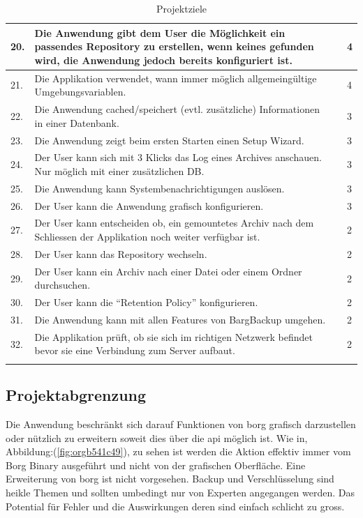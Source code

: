 \begin{longtable}{|p{1cm}|p{9cm}|p{1.5cm}|p{2cm}|}
\hline
20. & Die Anwendung gibt dem User die Möglichkeit ein passendes Repository zu erstellen, wenn keines gefunden wird, die Anwendung jedoch bereits konfiguriert ist. &  & 4\\
\hline
21. & Die Applikation verwendet, wann immer möglich allgemeingültige Umgebungsvariablen. &  & 4\\
\hline
22. & Die Anwendung cached/speichert (evtl. zusätzliche) Informationen in einer Datenbank. &  & 3\\
\hline
23. & Die Anwendung zeigt beim ersten Starten einen Setup Wizard. &  & 3\\
\hline
24. & Der User kann sich mit 3 Klicks das Log eines Archives anschauen. Nur möglich mit einer zusätzlichen DB. &  & 3\\
\hline
25. & Die Anwendung kann Systembenachrichtigungen auslösen. &  & 3\\
\hline
26. & Der User kann die Anwendung grafisch konfigurieren. &  & 3\\
\hline
27. & Der User kann entscheiden ob, ein gemountetes Archiv nach dem Schliessen der Applikation noch weiter verfügbar ist. &  & 2\\
\hline
28. & Der User kann das Repository wechseln. &  & 2\\
\hline
29. & Der User kann ein Archiv nach einer Datei oder einem Ordner durchsuchen. &  & 2\\
\hline
30. & Der User kann die "`Retention Policy"' konfigurieren. &  & 2\\
\hline
31. & Die Anwendung kann mit allen Features von BargBackup umgehen. &  & 2\\
\hline
32. & Die Applikation prüft, ob sie sich im richtigen Netzwerk befindet bevor sie eine Verbindung zum Server aufbaut. &  & 2\\
\hline
\caption{\label{tab:org9275be4}
Projektziele}
\\
\end{longtable}
\newpage

\subsection{Projektabgrenzung}
\label{sec:org336cfa6}

Die Anwendung beschränkt sich darauf Funktionen von \gls{borg} grafisch
darzustellen oder nützlich zu erweitern soweit dies über die \gls{api} möglich
ist. Wie in, Abbildung:(\ref{fig:orgb541c49}), zu sehen ist werden die Aktion effektiv
immer vom Borg Binary ausgeführt und nicht von der grafischen Oberfläche. Eine
Erweiterung von \gls{borg} ist nicht vorgesehen. Backup und Verschlüsselung sind
heikle Themen und sollten umbedingt nur von Experten angegangen werden. Das
Potential für Fehler und die Auswirkungen deren sind einfach schlicht zu gross.


